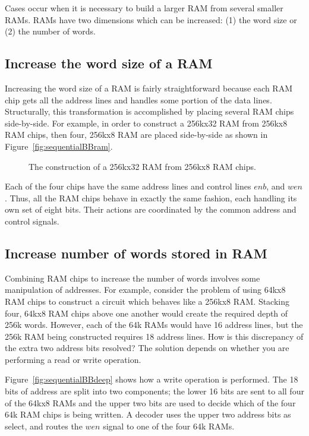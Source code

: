 Cases occur when it is necessary to build a larger RAM from several
smaller RAMs.  RAMs have two dimensions which can be increased: (1) the word size or
(2) the number of words.

\subsection{Increase the word size of a RAM}
Increasing the word size of a RAM is fairly straightforward because
each RAM chip gets all the address lines and handles some portion of
the data lines.  Structurally, this transformation is accomplished by
placing several RAM chips side-by-side. For example, in order
to construct a 256kx32 RAM from 256kx8 RAM chips, then four, 256kx8 RAM are
placed side-by-side as shown in Figure~\ref{fig:sequentialBBram}.

\begin{figure}[ht]
    \caption{The construction of a 256kx32 RAM from 256kx8 RAM chips.}
    \label{fig:sequentialBBwide}
\end{figure}

Each of the four chips have the same address lines and control
lines $enb$, and $wen$.  Thus, all the RAM chips behave in exactly the same
fashion, each handling its own set of eight bits.  Their actions are coordinated
by the common address and control signals.

\subsection{Increase number of words stored in RAM}
Combining RAM chips to increase the number of words involves some manipulation
of addresses.  For example, consider the problem of using 64kx8 RAM chips to
construct a circuit which behaves like a 256kx8 RAM.  Stacking four, 64kx8 RAM
chips above one another would create the required depth of 256k words.  However,
each of the 64k RAMs would have 16 address lines, but the 256k RAM being
constructed requires 18 address lines.  How is this discrepancy of the extra
two address bits resolved?  The solution depends on whether you are
performing a read or write operation.

Figure~\ref{fig:sequentialBBdeep} shows how a write operation is performed.
The 18 bits of address are split into two
components; the lower 16 bits are sent to all four of the 64kx8 RAMs
and the upper two bits are used to decide which of the four 64k RAM chips
is being written.  A decoder uses the upper two address bits as select, and routes
the $wen$ signal to one of the four 64k RAMs.

